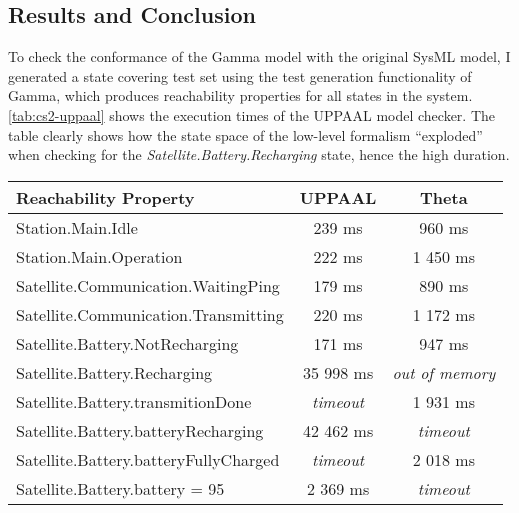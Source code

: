 \subsection{Results and Conclusion}

To check the conformance of the Gamma model with the original SysML model, I generated a state covering test set using the test generation functionality of Gamma, which produces reachability properties for all states in the system. \autoref{tab:cs2-uppaal} shows the execution times of the UPPAAL model checker. The table clearly shows how the state space of the low-level formalism ``exploded'' when checking for the \textsl{Satellite.Battery.Recharging} state, hence the high duration.

\begin{table}[!ht]
	\centering
	\begin{tabular}{|l|c|c|}
		\hline
		\textbf{Reachability Property}                       & \textbf{UPPAAL} & \textbf{Theta} \\ \hline
		Station.Main.Idle                    & 239 ms                              & 960 ms                  \\ \hline
		Station.Main.Operation               & 222 ms                              & 1 450 ms                  \\ \hline
		Satellite.Communication.WaitingPing  & 179 ms                              & 890 ms                  \\ \hline
		Satellite.Communication.Transmitting & 220 ms                              & 1 172 ms                  \\ \hline
		Satellite.Battery.NotRecharging      & 171 ms                              & 947 ms                  \\ \hline
		Satellite.Battery.Recharging         & 35 998 ms                              & \textit{out of memory}               \\ \hline
		Satellite.Battery.transmitionDone         & \textit{timeout}                              & 1 931 ms              \\ \hline
		Satellite.Battery.batteryRecharging         & 42 462 ms                              & \textit{timeout}               \\ \hline
		Satellite.Battery.batteryFullyCharged         & \textit{timeout}                              & 2 018 ms              \\ \hline
		Satellite.Battery.battery = 95         & 2 369 ms                             & \textit{timeout}               \\ \hline

\end{tabular}
\end{table}
